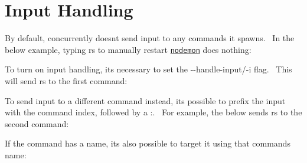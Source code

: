 \chapter{Input Handling }
\hypertarget{md__c_1_2xampp_2htdocs_2_g_pagos_ayuntamiento_2node__modules_2concurrently_2docs_2cli_2input-handling}{}\label{md__c_1_2xampp_2htdocs_2_g_pagos_ayuntamiento_2node__modules_2concurrently_2docs_2cli_2input-handling}
\label{md__c_1_2xampp_2htdocs_2_g_pagos_ayuntamiento_2node__modules_2concurrently_2docs_2cli_2input-handling_autotoc_md2239}%
%


By default, concurrently doesn\textquotesingle{}t send input to any commands it spawns.~\newline
 In the below example, typing {\ttfamily rs} to manually restart \href{https://nodemon.io/}{\texttt{nodemon}} does nothing\+:


\begin{DoxyCode}{0}

\end{DoxyCode}


To turn on input handling, it\textquotesingle{}s necessary to set the {\ttfamily -\/-\/handle-\/input}/{\ttfamily -\/i} flag.~\newline
 This will send {\ttfamily rs} to the first command\+:


\begin{DoxyCode}{0}

\end{DoxyCode}


To send input to a different command instead, it\textquotesingle{}s possible to prefix the input with the command index, followed by a {\ttfamily \+:}.~\newline
 For example, the below sends {\ttfamily rs} to the second command\+:


\begin{DoxyCode}{0}

\end{DoxyCode}


If the command has a name, it\textquotesingle{}s also possible to target it using that command\textquotesingle{}s name\+:


